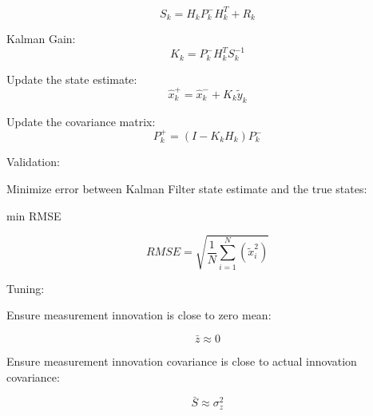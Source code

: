 \documentclass[11pt]{article}
\begin{document}
\[ S_k = H_k P_k^- H_k^T + R_k \] 


Kalman Gain: 
\[ K_k = P_k^- H_k^T S_k^{-1} \]

Update the state estimate: 
\[ \hat{x}_k^+ = \hat{x}_k^- + K_k \tilde{y}_k \]

Update the covariance matrix:
\[ P_k^+ = (I - K_k H_k) P_k^- \]

Validation:

Minimize error between Kalman Filter state estimate and the true states:

min RMSE 

\[ RMSE = \sqrt{\frac{1}{N} \sum_{i=1}^N (\tilde{x}_i^2)} \]

Tuning:

Ensure measurement innovation is close to zero mean:

\[ \bar{z} \approx 0 \] 

Ensure measurement innovation covariance is close to actual innovation covariance:


\[ \bar{S} \approx \sigma_z^2 \]
\end{document}
